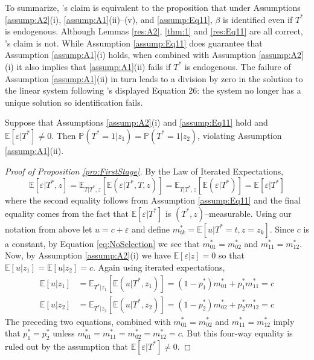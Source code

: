 To summarize, \citeauthor{Mahajan}'s claim is equivalent to the proposition that under Assumptions \ref{assump:A2}(i), \ref{assump:A1}(ii)--(v), and \ref{assump:Eq11}, $\beta$ is identified even if $T^*$ is endogenous.
Although Lemmas \ref{res:A2}, \ref{thm:1} and \ref{res:Eq11} are all correct, \citeauthor{Mahajan}'s claim is not.
While Assumption \ref{assump:Eq11} does guarantee that Assumption \ref{assump:A1}(i) holds, when combined with Assumption \ref{assump:A2}(i) it also implies that \ref{assump:A1}(ii) fails if $T^*$ is endogenous.
The failure of Assumption \ref{assump:A1}(ii) in turn leads to a division by zero in the solution to the linear system following \citeauthor{Mahajan}'s displayed Equation 26: the system no longer has a unique solution so identification fails. 
\begin{pro}
  \label{pro:FirstStage}
  Suppose that Assumptions \ref{assump:A2}(i) and \ref{assump:Eq11} hold and $\mathbb{E}[\varepsilon|T^*]\neq0$. Then $\mathbb{P}(T^*=1|z_1) = \mathbb{P}(T^*=1|z_2)$, violating Assumption \ref{assump:A1}(ii). 
\end{pro}
\begin{proof}[Proof of Proposition \ref{pro:FirstStage}]
  By the Law of Iterated Expectations,
  \begin{equation}
    \label{eq:NoSelection}
    \mathbb{E}[\varepsilon|T^*,z] = \mathbb{E}_{T|T^*,z}\left[\mathbb{E}\left(\varepsilon|T^*,T,z \right)  \right] = \mathbb{E}_{T|T^*,z}\left[\mathbb{E}\left(\varepsilon|T^* \right)  \right]
    = \mathbb{E}\left[ \varepsilon|T^* \right]
  \end{equation}
    where the second equality follows from Assumption \ref{assump:Eq11} and the final equality comes from the fact that $\mathbb{E}[\varepsilon|T^*]$ is $(T^*,z)$--measurable. 
  Using our notation from above let $u = c + \varepsilon$ and define $m^*_{tk}=\mathbb{E}[u|T^*=t,z=z_k]$.
  Since $c$ is a constant, by Equation \ref{eq:NoSelection} we see that $m^*_{01}=m^*_{02}$ and $m^*_{11}=m^*_{12}$.
  Now, by Assumption \ref{assump:A2}(i) we have $\mathbb{E}[\varepsilon|z]=0$ so that $\mathbb{E}[u|z_1]= \mathbb{E}[u|z_2] =c$.
  Again using iterated expectations, 
  \begin{align*}
    \mathbb{E}\left[u|z_1 \right] &= \mathbb{E}_{T^*|z_1}\left[\mathbb{E}\left( u|T^*,z_1 \right)  \right] = (1-p_1^*) m^*_{01} + p^*_1 m^*_{11}=c\\
    \mathbb{E}\left[u|z_2 \right] &= \mathbb{E}_{T^*|z_2}\left[\mathbb{E}\left( u|T^*,z_2 \right)  \right] = (1-p_2^*) m^*_{02} + p^*_2 m^*_{12}=c
  \end{align*}
  The preceding two equations, combined with $m^*_{01}=m^*_{02}$ and $m^*_{11}=m^*_{12}$ imply that $p_1^* = p_2^*$ unless $m^*_{01} = m^*_{11} = m^*_{02} = m^*_{12} = c$.
  But this four-way equality is ruled out by the assumption that $\mathbb{E}[\varepsilon|T^*]\neq0$. 
\end{proof}

